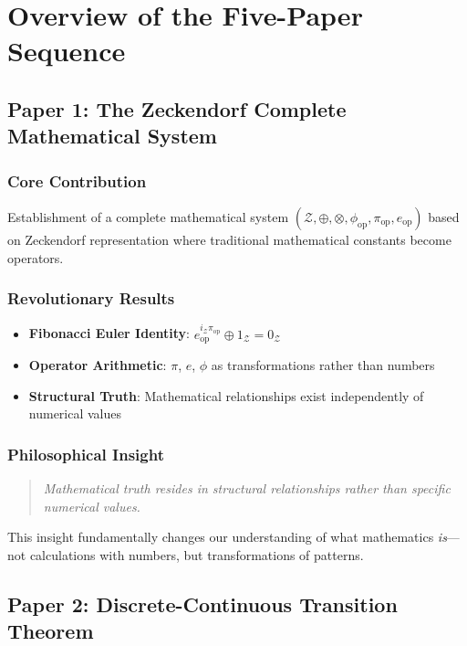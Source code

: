 \documentclass[12pt]{article}
\theoremstyle{plain}
\theoremstyle{definition}
\begin{document}
\section{Overview of the Five-Paper Sequence}

\subsection{Paper 1: The Zeckendorf Complete Mathematical System}

\subsubsection{Core Contribution}
Establishment of a complete mathematical system $(\mathcal{Z}, \oplus, \otimes, \phi_{\text{op}}, \pi_{\text{op}}, e_{\text{op}})$ based on Zeckendorf representation where traditional mathematical constants become operators.

\subsubsection{Revolutionary Results}
\begin{itemize}
\item \textbf{Fibonacci Euler Identity}: $e_{\text{op}}^{i_{\mathcal{Z}}\pi_{\text{op}}} \oplus 1_{\mathcal{Z}} = 0_{\mathcal{Z}}$
\item \textbf{Operator Arithmetic}: $\pi$, $e$, $\phi$ as transformations rather than numbers
\item \textbf{Structural Truth}: Mathematical relationships exist independently of numerical values
\end{itemize}

\subsubsection{Philosophical Insight}
\begin{quote}
\emph{Mathematical truth resides in structural relationships rather than specific numerical values.}
\end{quote}

This insight fundamentally changes our understanding of what mathematics \emph{is}—not calculations with numbers, but transformations of patterns.

\subsection{Paper 2: Discrete-Continuous Transition Theorem}
\end{document}

